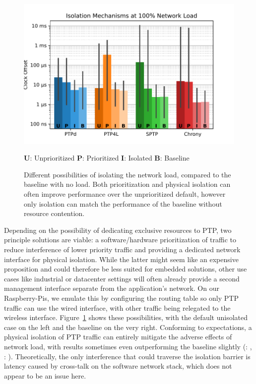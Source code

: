 \begin{figure}
    \includegraphics[width=\linewidth]{res/generated/net_isolation_comparison.pdf}
    \begin{center}
    \vspace{-0.5cm}
    \sffamily\scriptsize \textbf{U}: Unprioritized \quad\textbf{P}: Prioritized \quad\textbf{I}: Isolated \quad\textbf{B}: Baseline
    \end{center}
    \caption{Different possibilities of isolating the network load, compared to the baseline with no load. Both prioritization and physical isolation can often improve performance over the unprioritized default, however only isolation can match the performance of the baseline without resource contention.}
    \label{fig:net_isolation_comparison}
\end{figure}

Depending on the possibility of dedicating exclusive resources to PTP, two principle solutions are viable: a software/hardware prioritization of traffic to reduce interference of lower priority traffic and providing a dedicated network interface for physical isolation. While the latter might seem like an expensive proposition and could therefore be less suited for embedded solutions, other use cases like industrial or datacenter settings will often already provide a second management interface separate from the application's network. On our Raspberry-Pis, we emulate this by configuring the routing table so only PTP traffic can use the wired interface, with other traffic being relegated to the wireless interface. Figure~\ref{fig:net_isolation_comparison} shows these possibilities, with the default unisolated case on the left and the baseline on the very right.%
%
{}%
%
Conforming to expectations, a physical isolation of PTP traffic can entirely mitigate the adverse effects of network load, with results sometimes even outperforming the baseline slightly (\fVendor{\cmpMinArg}: \fRelative{\cmpMin}, \fVendor{\cmpMaxArg}: \fRelative{\cmpMax}).
Theoretically, the only interference that could traverse the isolation barrier is latency caused by cross-talk on the software network stack, which does not appear to be an issue here.

